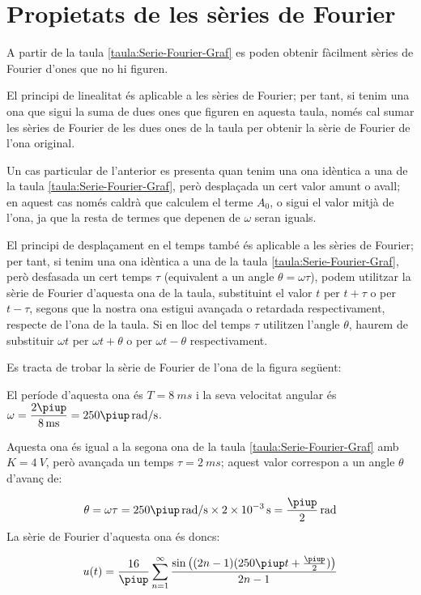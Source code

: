 \section{Propietats de les sèries de Fourier}

A partir de la taula \vref{taula:Serie-Fourier-Graf} es poden obtenir fàcilment sèries de Fourier d'ones que no hi figuren.

El principi de linealitat és aplicable a les sèries de Fourier; per tant, si tenim una ona que sigui la suma de dues ones que figuren en aquesta taula, només  cal sumar les sèries de Fourier de les dues ones de la taula per obtenir la sèrie de Fourier de l'ona original.

Un cas particular de l'anterior es presenta quan tenim una ona  idèntica a una de la taula \ref{taula:Serie-Fourier-Graf}, però desplaçada un cert valor amunt o avall; en aquest cas només caldrà que calculem el terme $A_0$, o sigui el valor mitjà de l'ona, ja que la resta de termes que depenen de $\omega$ seran iguals.

El principi de desplaçament en el temps també és aplicable a les sèries de Fourier; per tant, si tenim una ona idèntica a una de la taula \ref{taula:Serie-Fourier-Graf}, però desfasada un cert temps $\tau$ (equivalent a un angle $\theta = \omega \tau$), podem utilitzar la sèrie de Fourier d'aquesta ona de la taula, substituint el valor $t$ per $t+\tau$ o per $t-\tau$, segons que la nostra ona estigui avançada o retardada respectivament, respecte de l'ona de la taula. Si en lloc del temps $\tau$ utilitzen l'angle $\theta$, haurem de substituir  $\omega t$ per $\omega t + \theta$ o per $\omega t - \theta$ respectivament.


\begin{exemple}[\SerieFouTaulaFormes{}]
	\addcontentsxms{\SerieFouTaulaFormes}
    Es tracta de trobar la sèrie de Fourier de l'ona de la figura següent:
    \begin{center}
        
    \end{center}

    El període d'aquesta ona és $T=\qty{8}{ms}$ i la seva velocitat angular és $\omega = \dfrac{2\piup}{\qty{8}{ms}} = 250 \piup\unit{\,rad/s}$.

    Aquesta ona és igual a la segona ona de la taula \vref{taula:Serie-Fourier-Graf} amb $K=\qty{4}{V}$, però avançada un temps $\tau=\qty{2}{ms}$; aquest valor correspon a un angle $\theta$ d'avanç de:

    \[
        \theta = \omega \tau = 250\piup\unit{\,rad/s} \times \qty{2e-3}{s} = \frac{\piup}{2}\unit{\,rad}
    \]
    La sèrie de Fourier d'aquesta ona és doncs:

    \[
    u(t) = \frac{{16}}{\piup }\sum\limits_{n = 1}^\infty  {\frac{{\sin \big((2n - 1)(250\piup t+ \frac{\piup}{2})\big)}}{{2n - 1}}}
    \]
\end{exemple}

